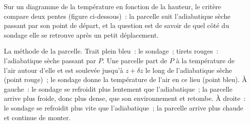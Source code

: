 Sur un diagramme de la température en fonction de la hauteur, le critère compare deux pentes
(figure ci-dessous)~: la parcelle suit l'adiabatique sèche passant par son point de départ,
et la question est de savoir de quel côté du sondage elle se retrouve après un petit
déplacement.

\begin{omfigure}

{\small La méthode de la parcelle. Trait plein bleu~: le sondage~; tirets rouges~:
l'adiabatique sèche passant par $P$. Une parcelle part de $P$ à la température de l'air autour
d'elle et est soulevée jusqu'à $z + \delta z$ le long de l'adiabatique sèche (point rouge)~; le sondage
donne la température de l'air en ce lieu (point bleu). À gauche~: le sondage
se refroidit plus lentement que l'adiabatique~; la parcelle arrive plus froide, donc plus dense, que
son environnement et retombe. À droite~: le sondage se refroidit plus vite que
l'adiabatique~; la parcelle arrive plus chaude et continue de monter.}
\label{fig:b1:fluid-envelopes-structure:parcel}
\end{omfigure}


